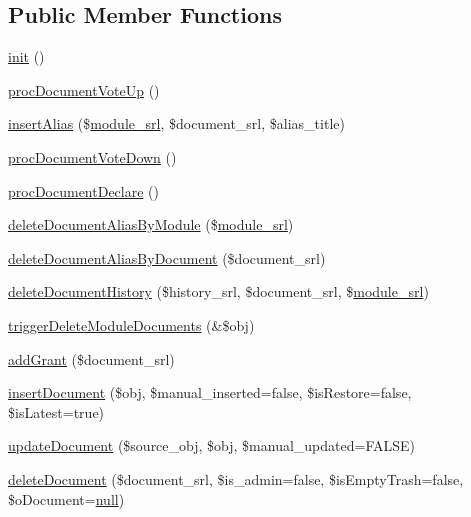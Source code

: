 \subsection*{Public Member Functions}
\begin{DoxyCompactItemize}
\item 
\hyperlink{classdocumentController_a3b20277855e8275a99ba25a63c720f7c}{init} ()
\item 
\hyperlink{classdocumentController_a32058ce80d8db1a0b6a97ce1d849afac}{proc\+Document\+Vote\+Up} ()
\item 
\hyperlink{classdocumentController_a4ab39cd64c6d7871868bbce8ca4486ee}{insert\+Alias} (\$\hyperlink{ko_8install_8php_a370bb6450fab1da3e0ed9f484a38b761}{module\+\_\+srl}, \$document\+\_\+srl, \$alias\+\_\+title)
\item 
\hyperlink{classdocumentController_a2df8114d4cfbe0a01c6bf29f68884d6e}{proc\+Document\+Vote\+Down} ()
\item 
\hyperlink{classdocumentController_a9c23f01e72bf1028d72f43ebf08d0cee}{proc\+Document\+Declare} ()
\item 
\hyperlink{classdocumentController_aca369b51be40b67d7c2456f4e2f28598}{delete\+Document\+Alias\+By\+Module} (\$\hyperlink{ko_8install_8php_a370bb6450fab1da3e0ed9f484a38b761}{module\+\_\+srl})
\item 
\hyperlink{classdocumentController_a0dc624a7dd83ce881a7ff136066160aa}{delete\+Document\+Alias\+By\+Document} (\$document\+\_\+srl)
\item 
\hyperlink{classdocumentController_a01a4d3351ede905b2158174af58ca0a8}{delete\+Document\+History} (\$history\+\_\+srl, \$document\+\_\+srl, \$\hyperlink{ko_8install_8php_a370bb6450fab1da3e0ed9f484a38b761}{module\+\_\+srl})
\item 
\hyperlink{classdocumentController_a6b5c3aae5cb5a4fd51350a597963d73a}{trigger\+Delete\+Module\+Documents} (\&\$obj)
\item 
\hyperlink{classdocumentController_af5d7f1c94c924d19c3cf4c94f13dc90d}{add\+Grant} (\$document\+\_\+srl)
\item 
\hyperlink{classdocumentController_ab3b1090cdebc810569b64f3a87ab0637}{insert\+Document} (\$obj, \$manual\+\_\+inserted=false, \$is\+Restore=false, \$is\+Latest=true)
\item 
\hyperlink{classdocumentController_a09cde49e8c89e2b580f302a459831cee}{update\+Document} (\$source\+\_\+obj, \$obj, \$manual\+\_\+updated=F\+A\+L\+SE)
\item 
\hyperlink{classdocumentController_a93df4318474646597031e6a1ea50c884}{delete\+Document} (\$document\+\_\+srl, \$is\+\_\+admin=false, \$is\+Empty\+Trash=false, \$o\+Document=\hyperlink{modernizr_8min_8js_a286f9ec831c5e676eeb493248eab9575}{null})

\end{DoxyCompactItemize}
